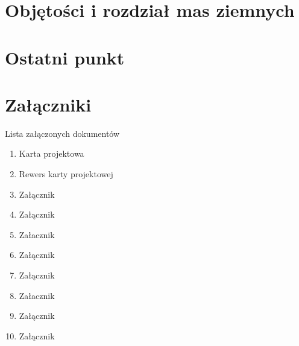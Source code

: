 \documentclass[12pt]{article}
\begin{document}
    
\section{Objętości i rozdział mas ziemnych}
\section{Ostatni punkt}
\clearpage
\section{Załączniki}
\centering Lista załączonych dokumentów
\begin{enumerate}
\item Karta projektowa
\item Rewers karty projektowej
\item Załącznik
\item Załącznik
\item Załacznik
\item Załącznik
\item Załącznik
\item Załacznik
\item Załącznik
\item Załącznik
\end{enumerate}


\end{document}
